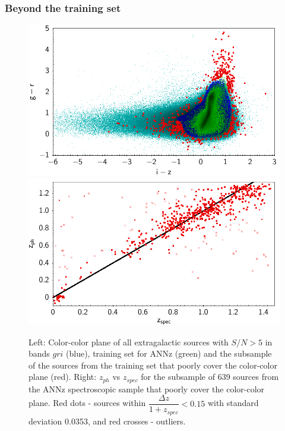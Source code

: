 \documentclass[apj,iop]{emulateapj}
\begin{document}

\subsubsection{Beyond the training set}

\begin{figure}[!ht]
\includegraphics[width=0.5\linewidth]{figures/color_color_annz_nobulk.png}
\includegraphics[width=0.5\linewidth]{figures/zphot_zspec_annz_nobulk.png}
\caption{Left: Color-color plane of all extragalactic sources with $S/N>5$ in bands $gri$ (blue), training set for ANNz (green) and the subsample of the sources from the training set that poorly cover the color-color plane (red). Right: $z_{ph}$ vs $z_{spec}$ for the subsample of 639 sources from the ANNz spectroscopic sample that poorly cover the color-color plane. Red dots - sources within $\dfrac{\Delta z}{1+z_{spec}}<0.15$ with standard deviation 0.0353, and red crosses - outliers.}
\label{fig:nobulk}
\end{figure}
\end{document}
